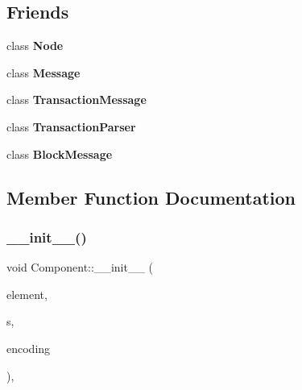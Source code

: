 \subsection*{Friends}
\begin{DoxyCompactItemize}
\item 
\mbox{\label{classMerkleTree_a6db9d28bd448a131448276ee03de1e6d}} 
class {\bfseries Node}
\item 
\mbox{\label{classMerkleTree_a658ef47bd757fd5e0f13adab5a417ced}} 
class {\bfseries Message}
\item 
\mbox{\label{classMerkleTree_a6a4f3eb8755476d75f7f57cef4cd3853}} 
class {\bfseries Transaction\+Message}
\item 
\mbox{\label{classMerkleTree_a760b1478b5214c122458f0f19d45c127}} 
class {\bfseries Transaction\+Parser}
\item 
\mbox{\label{classMerkleTree_a9acb1bbbd9c9589da9453187cfb6a794}} 
class {\bfseries Block\+Message}
\end{DoxyCompactItemize}


\subsection{Member Function Documentation}
\mbox{\label{classComponent_a28212595f8ee85fe009bd233bc99b2fc}} 
\subsubsection{\texorpdfstring{\+\_\+\+\_\+init\+\_\+\+\_\+()}{\_\_init\_\_()}}
{\footnotesize\ttfamily void Component\+::\+\_\+\+\_\+init\+\_\+\+\_\+ (\begin{DoxyParamCaption}\item[{\mbox{\hyperlink{classElementObject}{Element\+Object}} $\ast$}]{element,  }\item[{const \mbox{\hyperlink{classSerializer}{Serializer}} $\ast$}]{s,  }\item[{const char $\ast$}]{encoding }\end{DoxyParamCaption})\hspace{0.3cm}{\ttfamily [inline]}, {\ttfamily [inherited]}}

